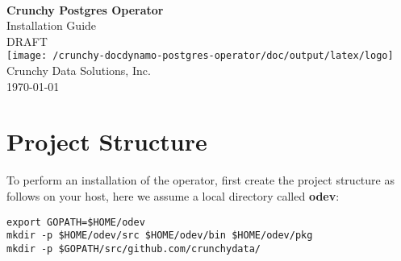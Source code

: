 \documentclass[letterpaper,12pt]{article}
\let\stdsection\section
\renewcommand\section{\newpage\stdsection}
\begin{document}
\hypersetup{pageanchor=false}

\makeatletter
    \begin{titlepage}
        \begin{center}
            {\large \ }\\[18ex]
            {\huge \bfseries Crunchy Postgres Operator}\\[1ex]
            {\large Installation Guide}\\[12ex]
            {\large DRAFT}\\[12ex]
            \texttt{[image: /crunchy-docdynamo-postgres-operator/doc/output/latex/logo]}\\[12ex]
            {\large Crunchy Data Solutions, Inc.}\\[1ex]
            {\large \today}
        \end{center}
    \end{titlepage}
\makeatother
\thispagestyle{empty}
\newpage

\hypersetup{pageanchor=true}

\setcounter{tocdepth}{3}
\thispagestyle{plain}
\renewcommand\contentsname{Table of Contents}
\tableofcontents


\section{Project Structure}\label{/_project_structure}

To perform an installation of the operator, first create the project structure as follows on your host, here we assume a local directory called \textbf{odev}:
\vspace{.75em}
\begin{lstlisting}
export GOPATH=$HOME/odev
mkdir -p $HOME/odev/src $HOME/odev/bin $HOME/odev/pkg
mkdir -p $GOPATH/src/github.com/crunchydata/
\end{lstlisting}
\end{document}
